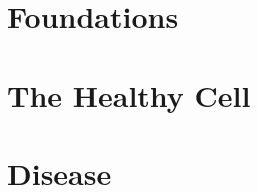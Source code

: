 \documentclass[11pt,a4paper,openright]{book}
\begin{document}
\frontmatter



\tableofcontents
\listoffigures
\listoftables




\mainmatter

\part{Foundations}
\label{part:foundations}






\part{The Healthy Cell}
\label{part:healthy}






\part{Disease}
\label{part:disease}



\end{document}

